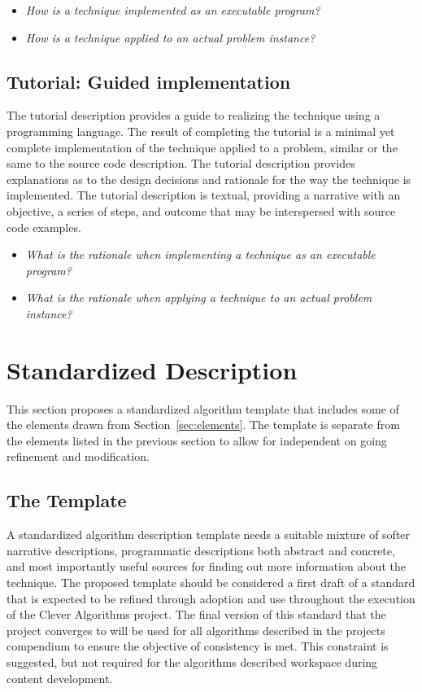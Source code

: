 \documentclass[a4paper, 11pt]{article}
\begin{document}
\begin{itemize}
	\item \emph{How is a technique implemented as an executable program?}
	\item \emph{How is a technique applied to an actual problem instance?}
\end{itemize}

\subsection{Tutorial: Guided implementation}
The tutorial description provides a guide to realizing the technique using a programming language. The result of completing the tutorial is a minimal yet complete implementation of the technique applied to a problem, similar or the same to the source code description. The tutorial description provides explanations as to the design decisions and rationale for the way the technique is implemented. The tutorial description is textual, providing a narrative with an objective, a series of steps, and outcome that may be interspersed with source code examples.

\begin{itemize}
	\item \emph{What is the rationale when implementing a technique as an executable program?}
	\item \emph{What is the rationale when applying a technique to an actual problem instance?}
\end{itemize}

\section{Standardized Description} 
\label{sec:template}
This section proposes a standardized algorithm template that includes some of the elements drawn from Section~\ref{sec:elements}. The template is separate from the elements listed in the previous section to allow for independent on going refinement and modification.

\subsection{The Template}
A standardized algorithm description template needs a suitable mixture of softer narrative descriptions, programmatic descriptions both abstract and concrete, and most importantly useful sources for finding out more information about the technique.  
The proposed template should be considered a first draft of a standard that is expected to be refined through adoption and use throughout the execution of the Clever Algorithms project. The final version of this standard that the project converges to will be used for all algorithms described in the projects compendium to ensure the objective of consistency is met. This constraint is suggested, but not required for the algorithms described workspace during content development.
\end{document}
